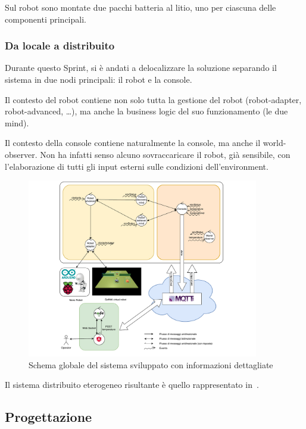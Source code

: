 Sul robot sono montate due pacchi batteria al litio, uno per ciascuna delle componenti principali.

\subsubsection{Da locale a distribuito}

Durante questo Sprint, si è andati a delocalizzare la soluzione separando il sistema in due nodi principali:
il robot e la console.

Il contesto del robot contiene non solo tutta la gestione del robot (robot-adapter, robot-advanced, \ldots), ma anche la business logic del suo funzionamento (le due mind).

Il contesto della console contiene naturalmente la console, ma anche il world-observer.
Non ha infatti senso alcuno sovraccaricare il robot, già sensibile, con l'elaborazione di tutti gli input esterni sulle condizioni dell'environment.

\begin{figure}[H]
  \centering
  \includegraphics[width=0.9\textwidth]{res/system.pdf}%
  \caption{Schema globale del sistema sviluppato con informazioni dettagliate}%
  \label{fig:sp4:system}
\end{figure}

Il sistema distribuito eterogeneo risultante è quello rappresentato in~.

\subsection{Progettazione}

